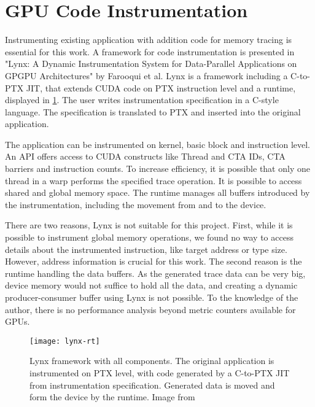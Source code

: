 \section{GPU Code Instrumentation}
Instrumenting existing application with addition code for memory tracing is essential for this work.
A framework for code instrumentation is presented in "Lynx: A Dynamic Instrumentation System for Data-Parallel Applications on GPGPU Architectures" \cite{Farooqui:2012:LDI:2310660.2310989} by Farooqui et al. Lynx is a framework including a C-to-PTX JIT, that extends CUDA code on PTX instruction level and a runtime, displayed in \ref{lynx-rt}. The user writes instrumentation specification in a C-style language. The specification is translated to PTX and inserted into the original application.

The application can be instrumented on kernel, basic block and instruction level. An API offers access to CUDA constructs like Thread and CTA IDs, CTA barriers and instruction counts. To increase
efficiency, it is possible that only one thread in a warp performs the specified trace operation. It is possible to access shared and global memory space. The runtime manages all buffers introduced by the instrumentation, including the movement from and to the device.

There are two reasons, Lynx is not suitable for this project. First, while it is possible to instrument global memory operations, we found no way to access details about the instrumented instruction, like target address or type size. However, address information is crucial for this work. The second reason
is the runtime handling the data buffers. As the generated trace data can be very big, device memory would not suffice to hold all the data, and creating a dynamic producer-consumer buffer using Lynx is not possible.
To the knowledge of the author, there is no performance analysis beyond metric counters available for GPUs.
\begin{figure}[t]
	\centering
	\texttt{[image: lynx-rt]}
	\caption[Lynx Framework]{Lynx framework with all components. The original application is instrumented on PTX level, with code generated by a C-to-PTX JIT from instrumentation specification. Generated data is moved and form the device by the runtime. Image from \cite{Farooqui:2012:LDI:2310660.2310989}}
	\label{lynx-rt}
\end{figure}
